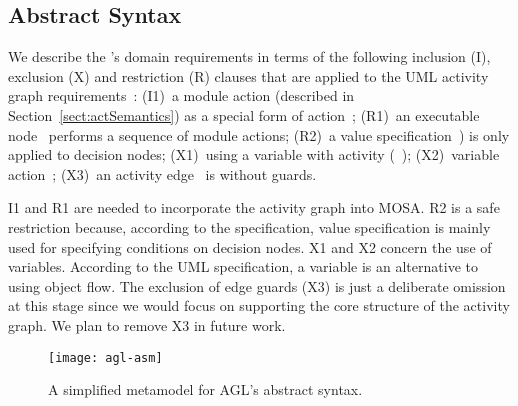 \subsection{Abstract Syntax} 
\label{subsect:agl-abstractSyntax}

We describe the \agl's domain requirements in terms of the following inclusion (I), exclusion (X) and restriction (R) clauses that are applied to the UML activity graph requirements~\cite{omg_unified_2017}: (I1)~a module action (described in Section~\ref{sect:actSemantics}) as a special form of action~\cite[p.~441]{omg_unified_2017}; (R1)~an executable node~\cite[p.~403]{omg_unified_2017} performs a sequence of module actions; (R2)~a value specification~\cite[p.~374]{omg_unified_2017}) is only applied to decision nodes; (X1)~using a variable with activity (~\cite[p.~377]{omg_unified_2017}); (X2)~variable action~\cite[p.~469]{omg_unified_2017}; (X3)~an activity edge~\cite[p.~373]{omg_unified_2017} is without guards.

I1 and R1 are needed to incorporate the activity graph into MOSA. R2 is a safe restriction because, according to the specification, value specification is mainly used for specifying conditions on decision nodes. X1 and X2 concern the use of variables. According to the UML specification, a variable is an alternative to using object flow. The exclusion of edge guards (X3) is just a deliberate omission at this stage since we would focus on supporting the core structure of the activity graph. We plan to remove X3 in future work.
%
%
\begin{figure*}[ht]
	\vspace{-0.1cm}	
	\begin{center}
		\texttt{[image: agl-asm]}
	\end{center}
\vspace{-0.6cm}
	\caption{A simplified metamodel for AGL's abstract syntax.} %
	\label{fig:agl-abstractSyntax}
	\vspace{-0.2cm}
\end{figure*}

